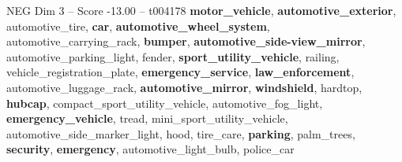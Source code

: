 \begin{textsample}{NEG Dim 3 – Score -13.00 – t004178}  \label{ex:f3_neg_002}
\textbf{motor\_vehicle}, \textbf{automotive\_exterior}, automotive\_tire, \textbf{car}, \textbf{automotive\_wheel\_system}, automotive\_carrying\_rack, \textbf{bumper}, \textbf{automotive\_side-view\_mirror}, automotive\_parking\_light, fender, \textbf{sport\_utility\_vehicle}, railing, vehicle\_registration\_plate, \textbf{emergency\_service}, \textbf{law\_enforcement}, automotive\_luggage\_rack, \textbf{automotive\_mirror}, \textbf{windshield}, hardtop, \textbf{hubcap}, compact\_sport\_utility\_vehicle, automotive\_fog\_light, \textbf{emergency\_vehicle}, tread, mini\_sport\_utility\_vehicle, automotive\_side\_marker\_light, hood, tire\_care, \textbf{parking}, palm\_trees, \textbf{security}, \textbf{emergency}, automotive\_light\_bulb, police\_car

\end{textsample}

